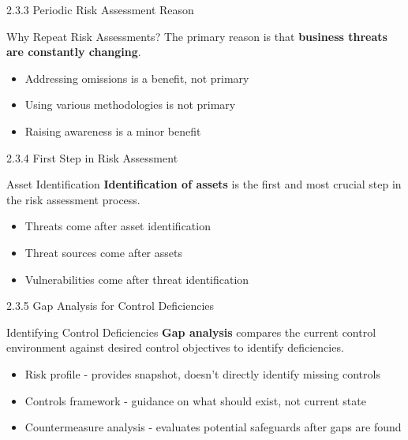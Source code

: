 \documentclass{beamer}
\begin{document}
	\begin{frame}{2.3.3 Periodic Risk Assessment Reason}
		\begin{block}{Why Repeat Risk Assessments?}
			The primary reason is that \textbf{business threats are constantly changing}.
		\end{block}
		\begin{itemize}
			\item Addressing omissions is a benefit, not primary
			\item Using various methodologies is not primary
			\item Raising awareness is a minor benefit
		\end{itemize}
	\end{frame}
	
	\begin{frame}{2.3.4 First Step in Risk Assessment}
		\begin{block}{Asset Identification}
			\textbf{Identification of assets} is the first and most crucial step in the risk assessment process.
		\end{block}
		\begin{itemize}
			\item Threats come after asset identification
			\item Threat sources come after assets
			\item Vulnerabilities come after threat identification
		\end{itemize}
	\end{frame}
	
	\begin{frame}{2.3.5 Gap Analysis for Control Deficiencies}
		\begin{block}{Identifying Control Deficiencies}
			\textbf{Gap analysis} compares the current control environment against desired control objectives to identify deficiencies.
		\end{block}
		\begin{itemize}
			\item Risk profile - provides snapshot, doesn't directly identify missing controls
			\item Controls framework - guidance on what should exist, not current state
			\item Countermeasure analysis - evaluates potential safeguards after gaps are found
		\end{itemize}
	\end{frame}
	
\end{document}
